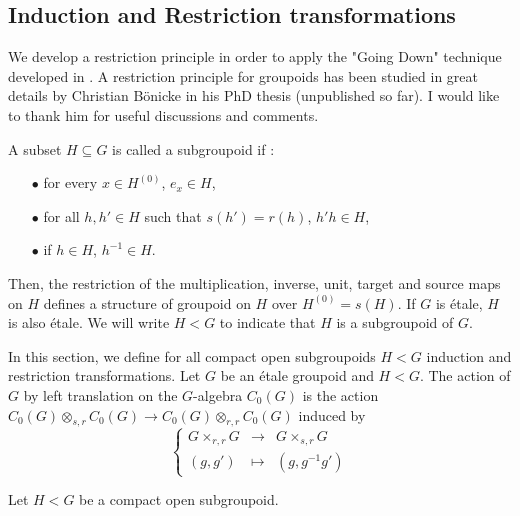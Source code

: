 \subsection{Induction and Restriction transformations}

We develop a restriction principle in order to apply the "Going Down" technique developed in \cite{ChabertEOY}. A restriction principle for groupoids has been studied in great details by Christian Bönicke in his PhD thesis (unpublished so far). I would like to thank him for useful discussions and comments.

\begin{definition} A subset $H\subseteq G$ is called a subgroupoid if :
\begin{itemize}
\item[$\bullet$] for every $x\in H^{(0)}$, $e_x\in H$,
\item[$\bullet$] for all $h,h'\in H $ such that $s(h') = r(h)$, $h'h \in H$,
\item[$\bullet$] if $h\in H$, $h^{-1}\in H$.
\end{itemize}
Then, the restriction of the multiplication, inverse, unit, target and source maps on $H$ defines a structure of groupoid on $H$ over $H^{(0)} = s(H)$. If $G$ is étale, $H$ is also étale. We will write $H< G$ to indicate that $H$ is a subgroupoid of $G$.
\end{definition}

In this section, we define for all compact open subgroupoids $H < G$ induction and restriction transformations. Let $G$ be an étale groupoid and $H<G$. The action of $G$ by left translation on the $G$-algebra $C_0(G)$ is the action $C_0(G)\otimes_{s,r} C_0(G) \rightarrow C_0(G)\otimes_{r,r} C_0(G)$ induced by 
\[\left\{ \begin{array}{rcl}
G\times_{r,r} G & \rightarrow & G\times_{s,r} G \\
(g,g') & \mapsto  & (g,g^{-1}g')  
\end{array}\right.\] 

Let $H < G$ be a compact open subgroupoid.\\



